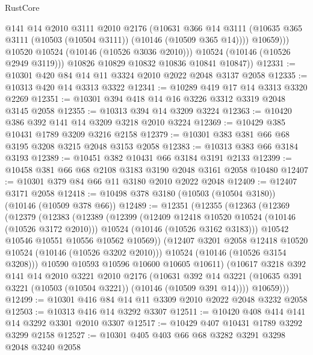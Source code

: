 \begin{lexlean}{RustCore}
\begin{coremodule}
                  @141
                  @14
                  @2010
                  @3111
                  @2010
                  @2176
                  (@10631
                    @366
                    @14
                    @3111
                    (@10635 @365 @3111 (@10503 (@10504 @3111)) (@10146 (@10509 @365 @14))))
                  @10659)))
            @10520
            @10524
            (@10146 (@10526 @3036 @2010)))
          @10524
          (@10146 (@10526 @2949 @3119)))
        @10826
        @10829
        @10832
        @10836
        @10841
        @10847))
@12331 := @10301 @420 @84 @14 @11 @3324 @2010 @2022 @2048 @3137 @2058
@12335 := @10313 @420 @14 @3313 @3322
@12341 := @10289 @419 @17 @14 @3313 @3320 @2269
@12351 := @10301 @394 @418 @14 @16 @3226 @3312 @3319 @2048 @3145 @2058
@12355 := @10313 @394 @14 @3209 @3224
@12363 := @10420 @386 @392 @141 @14 @3209 @3218 @2010 @3224
@12369 := @10429 @385 @10431 @1789 @3209 @3216 @2158
@12379 := @10301 @383 @381 @66 @68 @3195 @3208 @3215 @2048 @3153 @2058
@12383 := @10313 @383 @66 @3184 @3193
@12389 := @10451 @382 @10431 @66 @3184 @3191 @2133
@12399 := @10458 @381 @66 @68 @2108 @3183 @3190 @2048 @3161 @2058 @10480
@12407 := @10301 @379 @84 @66 @11 @3180 @2010 @2022 @2048
@12409 := @12407 @3171 @2058
@12418 := @10498 @378 @3180 (@10503 (@10504 @3180)) (@10146 (@10509 @378 @66))
@12489 := @12351
    (@12355
      (@12363
        (@12369
          (@12379
            (@12383
              (@12389
                (@12399
                  (@12409 @12418 @10520 @10524 (@10146 (@10526 @3172 @2010)))
                  @10524
                  (@10146 (@10526 @3162 @3183)))
                @10542
                @10546
                @10551
                @10556
                @10562
                @10569))
            (@12407 @3201 @2058 @12418 @10520 @10524 (@10146 (@10526 @3202 @2010)))
            @10524
            (@10146 (@10526 @3154 @3208)))
          @10590
          @10593
          @10596
          @10600
          @10605
          @10611)
        (@10617
          @3218
          @392
          @141
          @14
          @2010
          @3221
          @2010
          @2176
          (@10631
            @392
            @14
            @3221
            (@10635 @391 @3221 (@10503 (@10504 @3221)) (@10146 (@10509 @391 @14))))
          @10659)))
@12499 := @10301 @416 @84 @14 @11 @3309 @2010 @2022 @2048 @3232 @2058
@12503 := @10313 @416 @14 @3292 @3307
@12511 := @10420 @408 @414 @141 @14 @3292 @3301 @2010 @3307
@12517 := @10429 @407 @10431 @1789 @3292 @3299 @2158
@12527 := @10301 @405 @403 @66 @68 @3282 @3291 @3298 @2048 @3240 @2058

\end{coremodule}
\end{lexlean}
